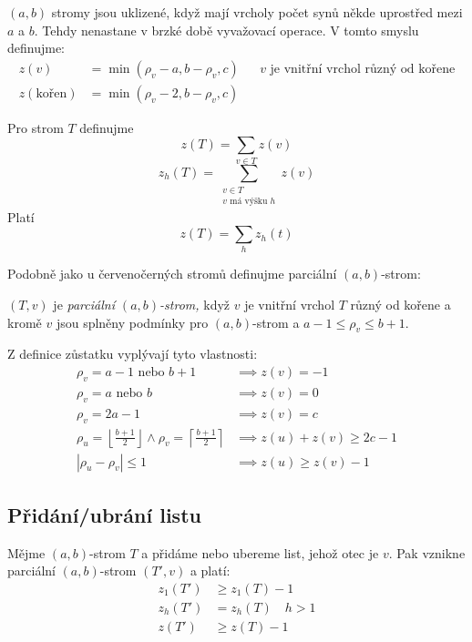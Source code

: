 $(a,b)$ stromy jsou uklizené, když mají vrcholy počet synů někde
uprostřed mezi $a$ a $b$. Tehdy nenastane v brzké době vyvažovací
operace. V tomto smyslu definujme:
\begin{align}
z(v) &=
	\min ( \rho_v - a, b - \rho_v, c ) 
	&&\text{$v$ je vnitřní vrchol různý od kořene}\\
z(\text{kořen}) &=
        \min ( \rho_v - 2, b - \rho_v, c ) 
\end{align}

Pro strom $T$ definujme 
\[
z(T) = \sum_{v \in T} z(v)
\]
\[
z_h(T) = \sum_{\substack{v \in T\\v \text{ má výšku } h}} z(v)
\]
Platí
\[
z(T) = \sum_h z_h(t)
\]

Podobně jako u červenočerných stromů definujme parciální $(a,b)$-strom:
\begin{defn}
$(T,v)$ je \emph{parciální $(a,b)$-strom,} když $v$ je vnitřní vrchol $T$
různý od kořene a
kromě $v$ jsou splněny podmínky pro $(a,b)$-strom a
$a-1 \leq \rho_v \leq b+1$.
\end{defn}

Z definice zůstatku vyplývají tyto vlastnosti:
\begin{align}
\label{ab-1}
  \rho_v = a-1 \text{ nebo }b+1 &\implies z(v) = -1\\
\label{ab-0}
  \rho_v = a \text{ nebo } b    &\implies z(v) = 0\\
\label{ab-spojeni}
  \rho_v = 2a-1                 &\implies z(v) = c\\
\label{ab-stepeni}
  \rho_u = \left\lfloor\frac{b+1}{2}\right\rfloor \land
  \rho_v = \left\lceil \frac{b+1}{2}\right\rceil
                                &\implies z(u)+z(v) \geq 2c - 1\\
\label{ab-presun}
  |\rho_u - \rho_v| \leq 1      &\implies z(u) \geq z(v) - 1
\end{align}

\subsection{Přidání/ubrání listu}

Mějme $(a,b)$-strom $T$ a přidáme nebo ubereme list, jehož otec je $v$.
Pak vznikne parciální $(a,b)$-strom $(T',v)$ a platí:
\begin{align}
  z_1(T')        & \geq z_1(T) - 1\\
  z_h(T')        & = z_h(T) \quad h>1\\
  z(T')          & \geq z(T) - 1
\end{align}

